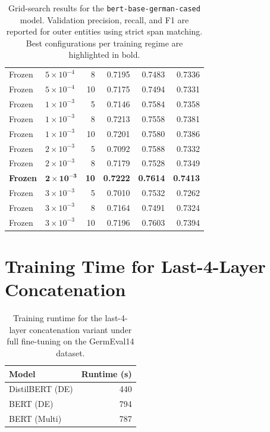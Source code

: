 \documentclass[11pt,a4paper,twocolumn]{article}
\begin{document}
\begin{table}[t]
\begin{tabular}{@{}llrrrr@{}}
Frozen & $5\times10^{-4}$ & 8  & 0.7195 & 0.7483 & 0.7336 \\
Frozen & $5\times10^{-4}$ & 10 & 0.7175 & 0.7494 & 0.7331 \\
Frozen & $1\times10^{-3}$ & 5  & 0.7146 & 0.7584 & 0.7358 \\
Frozen & $1\times10^{-3}$ & 8  & 0.7213 & 0.7558 & 0.7381 \\
Frozen & $1\times10^{-3}$ & 10 & 0.7201 & 0.7580 & 0.7386 \\
Frozen & $2\times10^{-3}$ & 5  & 0.7092 & 0.7588 & 0.7332 \\
Frozen & $2\times10^{-3}$ & 8  & 0.7179 & 0.7528 & 0.7349 \\
\textbf{Frozen} & $\mathbf{2\times10^{-3}}$ & \textbf{10} & \textbf{0.7222} & \textbf{0.7614} & \textbf{0.7413} \\
Frozen & $3\times10^{-3}$ & 5  & 0.7010 & 0.7532 & 0.7262 \\
Frozen & $3\times10^{-3}$ & 8  & 0.7164 & 0.7491 & 0.7324 \\
Frozen & $3\times10^{-3}$ & 10 & 0.7196 & 0.7603 & 0.7394 \\
\bottomrule
\end{tabular}
\caption{Grid-search results for the \texttt{bert-base-german-cased} model. Validation precision, recall, and F1 are reported for outer entities using strict span matching. Best configurations per training regime are highlighted in bold.}
\label{tab:hyperparams-full-list}
\end{table}


\FloatBarrier
\section{Training Time for Last-4-Layer Concatenation}

\label{app:Training-Time-Last4}
\begin{table}[h]
    \centering
    \begin{tabular}{lr}
        \toprule
        \textbf{Model} & \textbf{Runtime (s)} \\
        \midrule
        DistilBERT (DE) & 440 \\
        BERT (DE)       & 794 \\
        BERT (Multi)    & 787 \\
        \bottomrule
    \end{tabular}
    \caption{Training runtime for the last-4-layer concatenation variant under full fine-tuning on the GermEval14 dataset.}
    \label{tab:last4-train-full}
\end{table}
\end{document}
